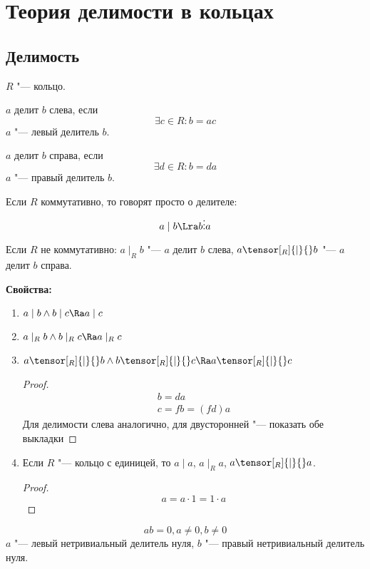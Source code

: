 \chapter{Теория делимости в кольцах}

\section{Делимость}

$R$ "--- кольцо.

\begin{Def}
	$a$ делит $b$ слева, если
	\[  \exists c \in R \colon b = ac \]
	$a$ "--- левый делитель $b$.
\end{Def}

\begin{Def}
	$a$ делит $b$ справа, если
	\[ \exists d \in R \colon b = da \]
	$a$ "--- правый делитель $b$.
\end{Def}

Если $R$ коммутативно, то говорят просто о делителе:
\[ a \mid b \Lra  b \vdots a \]

Если $R$ не коммутативно:
$a \mid_R b$ "--- $a$ делит $b$ слева, $a \tensor[_R]{\mid}{} b$ "--- $a$ делит $b$ справа.

\textbf{Свойства:}
\begin{enumerate}
	\item $a \mid b \land b \mid c \Ra a \mid c$
	\item $a \mid_R b \land b \mid_R c \Ra a \mid_R c$
	\item $a \tensor[_R]{\mid}{} b \land  b \tensor[_R]{\mid}{} c \Ra a \tensor[_R]{\mid}{} c$
	\begin{proof}
		\begin{gather*}
			 b = da \\
			 c = fb = (fd)a
		\end{gather*}
		Для делимости слева аналогично, для двусторонней "--- показать обе выкладки
	\end{proof}
	\item Если $R$ "--- кольцо с единицей, то $a \mid a$, $a \mid_R a$, $a \tensor[_R]{\mid}{} a$.
	\begin{proof}
		\[ a = a \cdot 1 = 1 \cdot a \]
	\end{proof}
\end{enumerate}

\begin{Def}
	\[ ab = 0, a \ne 0 ,b \ne 0 \]
	$a$ "--- левый нетривиальный делитель нуля, $b$ "--- правый нетривиальный делитель нуля.
\end{Def}

